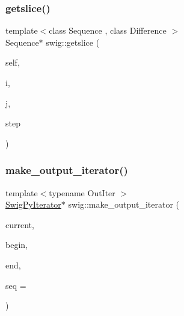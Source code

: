 \mbox{\label{namespaceswig_a45270051abad591470793777e97cc8ee}} 
\subsubsection{\texorpdfstring{getslice()}{getslice()}}
{\footnotesize\ttfamily template$<$class Sequence , class Difference $>$ \\
Sequence$\ast$ swig\+::getslice (\begin{DoxyParamCaption}\item[{const Sequence $\ast$}]{self,  }\item[{Difference}]{i,  }\item[{Difference}]{j,  }\item[{\hyperlink{libstructural__wrap__python_8cpp_a47424a8953c340f500027db7e6c00173}{Py\+\_\+ssize\+\_\+t}}]{step }\end{DoxyParamCaption})\hspace{0.3cm}{\ttfamily [inline]}}

\mbox{\label{namespaceswig_a6805f9c4a87ccbe557a92cfb57a40796}} 
\subsubsection{\texorpdfstring{make\+\_\+output\+\_\+iterator()}{make\_output\_iterator()}\hspace{0.1cm}{\footnotesize\ttfamily [1/2]}}
{\footnotesize\ttfamily template$<$typename Out\+Iter $>$ \\
\hyperlink{structswig_1_1_swig_py_iterator}{Swig\+Py\+Iterator}$\ast$ swig\+::make\+\_\+output\+\_\+iterator (\begin{DoxyParamCaption}\item[{const Out\+Iter \&}]{current,  }\item[{const Out\+Iter \&}]{begin,  }\item[{const Out\+Iter \&}]{end,  }\item[{Py\+Object $\ast$}]{seq = {} }\end{DoxyParamCaption})\hspace{0.3cm}{\ttfamily [inline]}}

\mbox{\label{namespaceswig_abaeb0c78f71036fb0e597f10bdc6aa67}} 
